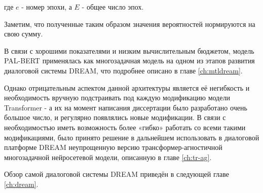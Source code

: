  где $e$ - номер эпохи, а $E$ - общее число эпох. 
 
Заметим, что полученные таким образом значения вероятностей нормируются на свою сумму. 

В связи с хорошими показателями и низким вычислительным бюджетом, модель PAL-BERT применялась как многозадачная модель на одном из этапов развития диалоговой системы DREAM, что подробнее описано в главе \ref{ch:mtldream}.

Однако отрицательным аспектом данной архитектуры является её негибкость и необходимость вручную подстраивать под каждую модификацию модели Transformer - а их на момент написания диссертации было разработано очень большое число, и регулярно появлялись новые модификации. В связи с необходимостью иметь возможность более «гибко» работать со всеми такими модификациями, было  принято решение в дальнейшем использовать в диалоговой платформе {DREAM} неупрощенную версию трансформер-агностичной многозадачной нейросетевой модели, описанную в главе \ref{ch:tr-ag}.

Обзор самой диалоговой системы {DREAM} приведён в следующей главе \ref{ch:dream}.
